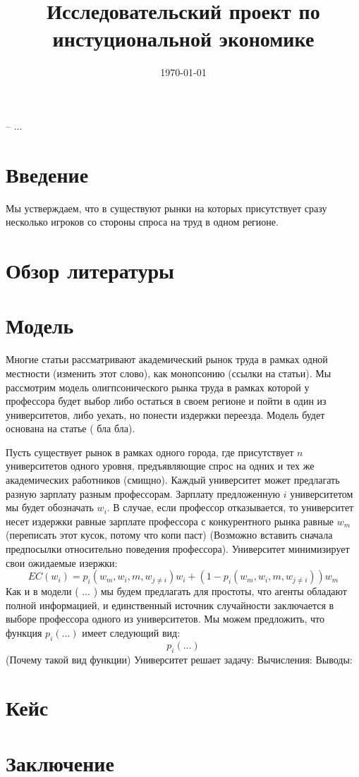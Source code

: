 \documentclass[a4paper, 12pt]{article}
\title{Исследовательский проект по инстуциональной экономике}
\date{\today}
\theoremstyle{definition}
\theoremstyle{plain}
\begin{document}
\maketitle

-- ...

\section{Введение}
Мы устверждаем, что в существуют рынки на которых присутствует сразу несколько игроков со стороны спроса на труд в одном регионе. 
\section{Обзор литературы}

\section{Модель}

Многие статьи рассматривают академический рынок труда в рамках одной местности (изменить этот слово), как монопсонию (ссылки на статьи). Мы рассмотрим модель олигпсонического рынка труда в рамках которой у профессора будет выбор либо остаться в своем регионе и пойти в один из университетов, либо уехать, но понести издержки переезда. Модель будет основана на статье ( бла бла). 

Пусть существует рынок в рамках одного города, где присутствует $n$ университетов одного уровня, предъявляющие спрос на одних и тех же академических работников (смищно). Каждый университет может предлагать разную зарплату разным профессорам. Зарплату предложенную $i$ университетом мы будет обозначать $w_i$. В случае, если профессор отказывается, то университет несет издержки равные зарплате профессора с конкурентного рынка равные $w_m$ (переписать этот кусок, потому что копи паст) (Возможно вставить сначала предпосылки относительно поведения профессора). Университет минимизирует свои ожидаемые изержки: 
\[
EC(w_i) = p_i(w_m, w_i, m, w_{j \neq i})w_i + (1 - p_i(w_m, w_i, m, w_{j \neq i}))w_m
\]
Как и в модели ( ... ) мы будем предлагать для простоты, что агенты обладают полной информацией, и единственный источник случайности заключается в выборе профессора одного из университетов. Мы можем предложить, что функция $p_i (\ldots) $ имеет следующий вид: 
\[
p_i( \ldots) 
\]
(Почему такой вид функции) 
Университет решает задачу: 
Вычисления: 
Выводы: 


\section{Кейс}

\section{Заключение}
\end{document}
